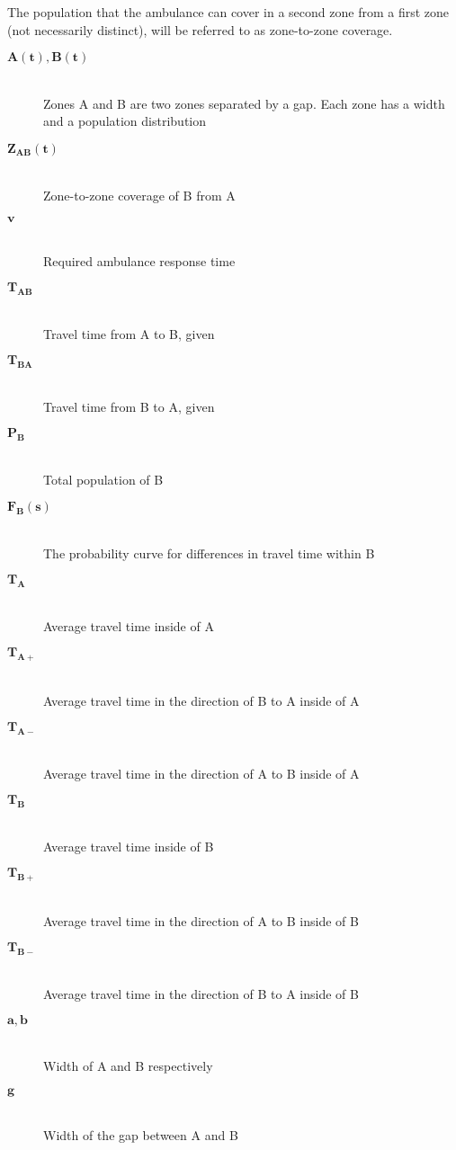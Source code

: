 \documentclass[notitlepage, 12pt]{article}
\begin{document}
The population that the ambulance can cover in a second zone from a first zone (not necessarily distinct), will be referred to as zone-to-zone coverage.

\begin{description}
    \item[$\mathbf{A(t), B(t)}$] \hfill \\
    	Zones A and B are two zones separated by a gap. Each zone has a width and a population distribution
    \item[$\mathbf{Z_{AB}(t)}$] \hfill \\
    	Zone-to-zone coverage of B from A
    \item[$\mathbf{v}$] \hfill \\
    	Required ambulance response time
    \item[$\mathbf{T_{AB}}$] \hfill \\
    	Travel time from A to B, given
    \item[$\mathbf{T_{BA}}$] \hfill \\
    	Travel time from B to A, given
    \item[$\mathbf{P_B}$] \hfill \\
    	Total population of B
    \item[$\mathbf{F_B(s)}$] \hfill \\
    	The probability curve for differences in travel time within B
   \item[$\mathbf{T_A}$] \hfill \\
    	Average travel time inside of A
    \item[$\mathbf{T_{A+}}$] \hfill \\
    	Average travel time in the direction of B to A inside of A
    \item[$\mathbf{T_{A-}}$] \hfill \\
    	Average travel time in the direction of A to B inside of A
   \item[$\mathbf{T_B}$] \hfill \\
    	Average travel time inside of B
    \item[$\mathbf{T_{B+}}$] \hfill \\
    	Average travel time in the direction of A to B inside of B
    \item[$\mathbf{T_{B-}}$] \hfill \\
    	Average travel time in the direction of B to A inside of B
    \item[$\mathbf{a, b}$] \hfill \\
    	Width of A and B respectively
    \item[$\mathbf{g}$] \hfill \\
    	Width of the gap between A and B
\end{description}
\end{document}
